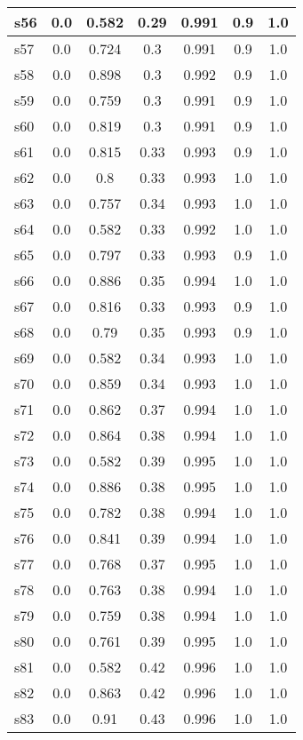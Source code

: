 \documentclass{article}
\begin{document}
\begin{tabular}{|l|c|c|c|c|c|c|}
\hline
s56 &0.0 & 0.582 & 0.29 & 0.991 & 0.9 & 1.0\\
\hline
s57 &0.0 & 0.724 & 0.3 & 0.991 & 0.9 & 1.0\\
\hline
s58 &0.0 & 0.898 & 0.3 & 0.992 & 0.9 & 1.0\\
\hline
s59 &0.0 & 0.759 & 0.3 & 0.991 & 0.9 & 1.0\\
\hline
s60 &0.0 & 0.819 & 0.3 & 0.991 & 0.9 & 1.0\\
\hline
s61 &0.0 & 0.815 & 0.33 & 0.993 & 0.9 & 1.0\\
\hline
s62 &0.0 & 0.8 & 0.33 & 0.993 & 1.0 & 1.0\\
\hline
s63 &0.0 & 0.757 & 0.34 & 0.993 & 1.0 & 1.0\\
\hline
s64 &0.0 & 0.582 & 0.33 & 0.992 & 1.0 & 1.0\\
\hline
s65 &0.0 & 0.797 & 0.33 & 0.993 & 0.9 & 1.0\\
\hline
s66 &0.0 & 0.886 & 0.35 & 0.994 & 1.0 & 1.0\\
\hline
s67 &0.0 & 0.816 & 0.33 & 0.993 & 0.9 & 1.0\\
\hline
s68 &0.0 & 0.79 & 0.35 & 0.993 & 0.9 & 1.0\\
\hline
s69 &0.0 & 0.582 & 0.34 & 0.993 & 1.0 & 1.0\\
\hline
s70 &0.0 & 0.859 & 0.34 & 0.993 & 1.0 & 1.0\\
\hline
s71 &0.0 & 0.862 & 0.37 & 0.994 & 1.0 & 1.0\\
\hline
s72 &0.0 & 0.864 & 0.38 & 0.994 & 1.0 & 1.0\\
\hline
s73 &0.0 & 0.582 & 0.39 & 0.995 & 1.0 & 1.0\\
\hline
s74 &0.0 & 0.886 & 0.38 & 0.995 & 1.0 & 1.0\\
\hline
s75 &0.0 & 0.782 & 0.38 & 0.994 & 1.0 & 1.0\\
\hline
s76 &0.0 & 0.841 & 0.39 & 0.994 & 1.0 & 1.0\\
\hline
s77 &0.0 & 0.768 & 0.37 & 0.995 & 1.0 & 1.0\\
\hline
s78 &0.0 & 0.763 & 0.38 & 0.994 & 1.0 & 1.0\\
\hline
s79 &0.0 & 0.759 & 0.38 & 0.994 & 1.0 & 1.0\\
\hline
s80 &0.0 & 0.761 & 0.39 & 0.995 & 1.0 & 1.0\\
\hline
s81 &0.0 & 0.582 & 0.42 & 0.996 & 1.0 & 1.0\\
\hline
s82 &0.0 & 0.863 & 0.42 & 0.996 & 1.0 & 1.0\\
\hline
s83 &0.0 & 0.91 & 0.43 & 0.996 & 1.0 & 1.0\\
\hline

\end{tabular}
\end{document}
